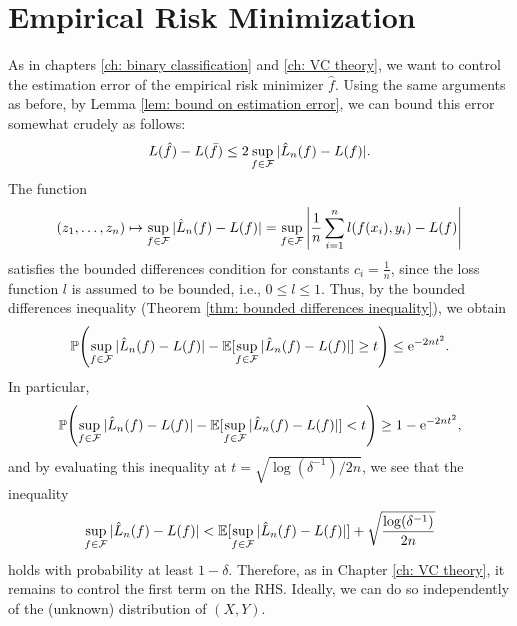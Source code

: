 \section{Empirical Risk Minimization}

As in chapters \ref{ch: binary classification} and \ref{ch: VC theory}, we want to control the estimation error of the empirical risk minimizer $\hat{f}$. Using the same arguments as before, by Lemma \ref{lem: bound on estimation error}, we can bound this error somewhat crudely as follows:
\[
    L(\hat{f}) - L(\bar{f}) \leq 2 \sup_{f \in \mathcal{F}} \abs*{\hat{L}_n(f) - L(f)}.
\]
The function
\[
    (z_1, \dots, z_n) \mapsto \sup_{f \in \mathcal{F}} \abs*{\hat{L}_n(f) - L(f)} = \sup_{f \in \mathcal{F}} \abs{\frac{1}{n} \sum_{i=1}^n l(f(x_i), y_i) - L(f)}
\]
satisfies the bounded differences condition for constants $c_i = \frac{1}{n}$, since the loss function $l$ is assumed to be bounded, i.e., $0 \leq l \leq 1$. Thus, by the bounded differences inequality (Theorem \ref{thm: bounded differences inequality}), we obtain
\[
    \Prob\left(\sup_{f \in \mathcal{F}} \abs*{\hat{L}_n(f) - L(f)} - \Exp[\sup_{f \in \mathcal{F}} \abs*{\hat L_n(f) - L(f)}] \geq t\right) \leq \e^{-2nt^2}.
\]
In particular,
\[
    \Prob\left(\sup_{f \in \mathcal{F}} \abs*{\hat{L}_n(f) - L(f)} - \Exp[\sup_{f \in \mathcal{F}} \abs*{\hat{L}_n(f) - L(f)}] < t\right) \geq 1 - \e^{-2nt^2},
\]
and by evaluating this inequality at $t = \sqrt{\log(\delta^{-1}) / 2n}$, we see that the inequality
\[
    \sup_{f \in \mathcal{F}} \abs*{\hat{L}_n(f) - L(f)} < \Exp[\sup_{f \in \mathcal{F}} \abs*{\hat L_n(f) - L(f)}] + \sqrt{\frac{\log(\delta^{-1})}{2n}}
\]
holds with probability at least $1 - \delta$. Therefore, as in Chapter \ref{ch: VC theory}, it remains to control the first term on the RHS. Ideally, we can do so independently of the (unknown) distribution of $(X, Y)$.
